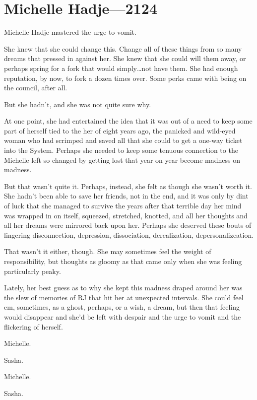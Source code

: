 \hypertarget{michelle-hadjesasha-2124}{%
\chapter{Michelle Hadje—2124}\label{michelle-hadjesasha-2124}}

Michelle Hadje mastered the urge to vomit.

She knew that she could change this. Change all of these things from so many dreams that pressed in against her. She knew that she could will them away, or perhaps spring for a fork that would simply\ldots not have them. She had enough reputation, by now, to fork a dozen times over. Some perks came with being on the council, after all.

But she hadn't, and she was not quite sure why.

At one point, she had entertained the idea that it was out of a need to keep some part of herself tied to the her of eight years ago, the panicked and wild-eyed woman who had scrimped and saved all that she could to get a one-way ticket into the System. Perhaps she needed to keep some tenuous connection to the Michelle left so changed by getting lost that year on year become madness on madness.

But that wasn't quite it. Perhaps, instead, she felt as though she wasn't worth it. She hadn't been able to save her friends, not in the end, and it was only by dint of luck that she managed to survive the years after that terrible day her mind was wrapped in on itself, squeezed, stretched, knotted, and all her thoughts and all her dreams were mirrored back upon her. Perhaps she deserved these bouts of lingering disconnection, depression, dissociation, derealization, depersonalizeation.

That wasn't it either, though. She may sometimes feel the weight of responsibility, but thoughts as gloomy as that came only when she was feeling particularly peaky.

Lately, her best guess as to why she kept this madness draped around her was the slew of memories of RJ that hit her at unexpected intervals. She could feel em, sometimes, as a ghost, perhaps, or a wish, a dream, but then that feeling would disappear and she'd be left with despair and the urge to vomit and the flickering of herself.

Michelle.

Sasha.

Michelle.

Sasha.

